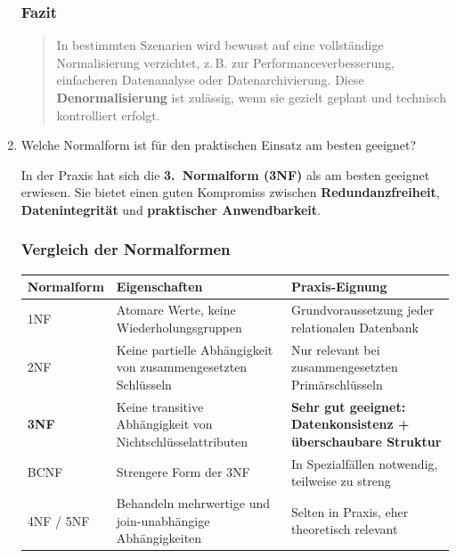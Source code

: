 \documentclass[a4paper,12pt]{article}
\begin{document}
\begin{enumerate}
		\subsubsection*{Fazit}
		
		\begin{quote}
			In bestimmten Szenarien wird bewusst auf eine vollständige Normalisierung verzichtet, z.\,B. zur Performanceverbesserung, einfacheren Datenanalyse oder Datenarchivierung.  
			Diese \textbf{Denormalisierung} ist zulässig, wenn sie gezielt geplant und technisch kontrolliert erfolgt.
		\end{quote}
		
		\item Welche Normalform ist für den praktischen Einsatz am besten geeignet?
		
		In der Praxis hat sich die \textbf{3.\ Normalform (3NF)} als am besten geeignet erwiesen. Sie bietet einen guten Kompromiss zwischen \textbf{Redundanzfreiheit}, \textbf{Datenintegrität} und \textbf{praktischer Anwendbarkeit}.
		
		\vspace{1em}
		
		\subsubsection*{Vergleich der Normalformen}
		
		\begin{tabular}{|l|p{6cm}|p{5cm}|}
			\hline
			\textbf{Normalform} & \textbf{Eigenschaften} & \textbf{Praxis-Eignung} \\
			\hline
			1NF & Atomare Werte, keine Wiederholungsgruppen & Grundvoraussetzung jeder relationalen Datenbank \\
			\hline
			2NF & Keine partielle Abhängigkeit von zusammengesetzten Schlüsseln & Nur relevant bei zusammengesetzten Primärschlüsseln \\
			\hline
			\textbf{3NF} & Keine transitive Abhängigkeit von Nichtschlüsselattributen & \textbf{Sehr gut geeignet: Datenkonsistenz + überschaubare Struktur} \\
			\hline
			BCNF & Strengere Form der 3NF & In Spezialfällen notwendig, teilweise zu streng \\
			\hline
			4NF / 5NF & Behandeln mehrwertige und join-unabhängige Abhängigkeiten & Selten in Praxis, eher theoretisch relevant \\
			\hline
		\end{tabular}
		

\end{enumerate}
\end{document}
